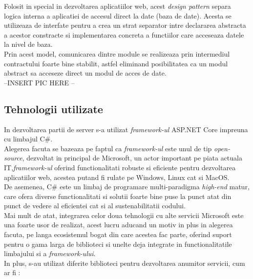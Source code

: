 Folosit in special in dezvoltarea aplicatiilor web, acest \textit{design pattern} separa logica interna a aplicatiei de accesul direct la date (baza de date). Acesta se utilizeaza de interfate pentru a crea un strat separator intre declararea abstracta a acestor constracte si implementarea concreta a functiilor care acceseaza datele la nivel de baza.\\
Prin acest model, comunicarea dintre module se realizeaza prin intermediul contractului foarte bine stabilit, astfel eliminand posibilitatea ca un modul abstract sa acceseze direct un modul de acces de date.\\

--INSERT PIC HERE --\\

\subsection*{Tehnologii utilizate}
In dezvoltarea partii de server s-a utilizat \textit{framework-ul } ASP.NET Core impreuna cu limbajul C\#.\\
Alegerea facuta se bazeaza pe faptul ca \textit{framework-ul} este unul de tip \textit{open-source}, dezvoltat in principal de Microsoft, un actor important pe piata actuala IT,\textit{framework-ul} oferind functionalitati robuste si eficiente pentru dezvoltarea aplicatiilor web, acestea putand fi rulate pe Windows, Linux cat si MacOS.\\
De asemenea, C\# este un limbaj de programare multi-paradigma \textit{high-end} matur, care ofera diverse functionalitati si solutii foarte bine puse la punct atat din punct de vedere al eficientei cat si al sustenabilitatii codului.\\
Mai mult de atat, integrarea celor doua tehnologii cu alte servicii Microsoft este una foarte usor de realizat, acest lucru aducand un motiv in plus in alegerea facuta, pe langa ecosistemul bogat din care acestea fac parte, oferind suport pentru o gama larga de biblioteci si unelte deja integrate in functionalitatile limbajului si a \textit{framework-ului}.\\
In plus, s-au utilizat diferite biblioteci pentru dezvoltarea anumitor servicii, cum ar fi :
